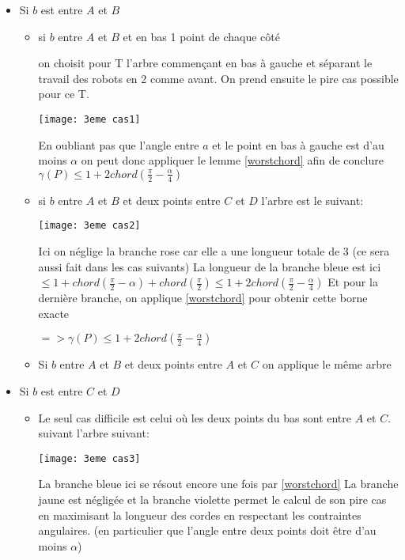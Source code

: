 \begin{itemize}

\item Si $b$ est entre $A$ et $B$

\begin{itemize}

\item si $b$ entre $A$ et $B$ et en bas 1 point de chaque côté

on choisit pour T l'arbre commençant en bas à gauche et séparant le travail des robots en 2 comme avant.
On prend ensuite le pire cas possible pour ce T.

\texttt{[image: 3eme cas1]}

En oubliant pas que l'angle entre $a$ et le point en bas à gauche est d'au moins $\alpha$ on peut donc appliquer le lemme \ref{worstchord} afin de conclure
$\gamma(P) \leq 1 + 2chord(\frac{\pi}{2} - \frac{\alpha}{4})$

\item si $b$ entre $A$ et $B$ et deux points entre $C$ et $D$
l'arbre est le suivant:

\texttt{[image: 3eme cas2]}

Ici on néglige la branche rose car elle a une longueur totale de 3 (ce sera aussi fait dans les cas suivants)
La longueur de la branche bleue est ici $\leq 1+chord\left(\frac{\pi}{2} - \alpha\right)+chord(\frac{\pi}{2}) \leq 1 + 2chord(\frac{\pi}{2} - \frac{\alpha}{4})$
Et pour la dernière branche, on applique \ref{worstchord} pour obtenir cette borne exacte

$=> \gamma(P) \leq 1 + 2chord(\frac{\pi}{2} - \frac{\alpha}{4})$

\item Si $b$ entre $A$ et $B$ et deux points entre $A$ et $C$ on applique le même arbre

\end{itemize}

\item Si $b$ est entre $C$ et $D$

\begin{itemize}

\item Le seul cas difficile est celui où les deux points du bas sont entre $A$ et $C$.
suivant l'arbre suivant:

\texttt{[image: 3eme cas3]}

La branche bleue ici se résout encore une fois par \ref{worstchord}
La branche jaune est négligée
et la branche violette permet le calcul de son pire cas en maximisant la longueur des cordes en respectant les contraintes angulaires. (en particulier que l'angle entre deux points doit être d'au moins $\alpha$)


\end{itemize}
\end{itemize}
